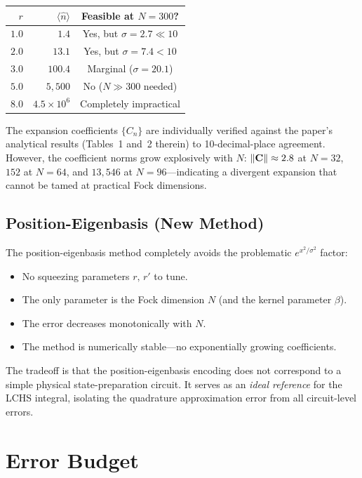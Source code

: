 \documentclass[11pt]{article}
\begin{document}
\begin{center}
\begin{tabular}{rrc}
  \toprule
  $r$ & $\langle\hat{n}\rangle$ & Feasible at $N=300$? \\
  \midrule
  $1.0$ & $1.4$ & Yes, but $\sigma = 2.7 \ll 10$ \\
  $2.0$ & $13.1$ & Yes, but $\sigma = 7.4 < 10$ \\
  $3.0$ & $100.4$ & Marginal ($\sigma = 20.1$) \\
  $5.0$ & $5{,}500$ & No ($N \gg 300$ needed) \\
  $8.0$ & $4.5\times 10^6$ & Completely impractical \\
  \bottomrule
\end{tabular}
\end{center}

The expansion coefficients $\{C_n\}$ are individually verified against
the paper's analytical results (Tables~1 and~2 therein) to 10-decimal-place
agreement.  However, the coefficient norms grow explosively with $N$:
$\norm{\vb{C}} \approx 2.8$ at $N=32$, $152$ at $N=64$, and $13{,}546$ at
$N=96$---indicating a divergent expansion that cannot be tamed at practical
Fock dimensions.

\subsection{Position-Eigenbasis (New Method)}

The position-eigenbasis method completely avoids the problematic
$e^{x^2/\sigma^2}$ factor:
\begin{itemize}
  \item No squeezing parameters $r,\,r'$ to tune.
  \item The only parameter is the Fock dimension $N$ (and the kernel
        parameter $\beta$).
  \item The error decreases monotonically with $N$.
  \item The method is numerically stable---no exponentially growing
        coefficients.
\end{itemize}

The tradeoff is that the position-eigenbasis encoding does not correspond
to a simple physical state-preparation circuit.  It serves as an
\emph{ideal reference} for the LCHS integral, isolating the quadrature
approximation error from all circuit-level errors.

\section{Error Budget}
\end{document}

